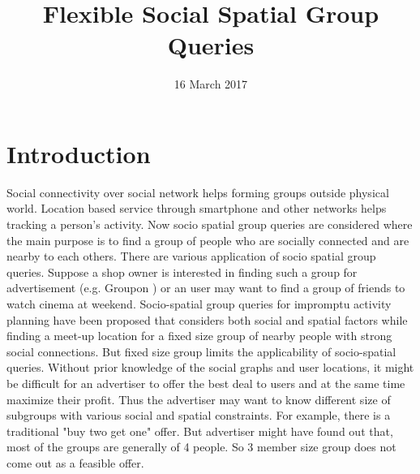 \documentclass{vldb}
\begin{document}
	\title{ Flexible Social Spatial Group Queries}
	
	
	\author{
	}
	
	\date{16 March 2017}
	\maketitle
	
	
	\begin {figure}
	\begin{center}
	
	\end{center}
	\end {figure}
	
	\section{Introduction}
		Social connectivity over social network helps forming groups outside physical world. Location based service through smartphone and other networks helps tracking a person's activity. Now socio spatial group queries are considered where the main purpose is to find a group of  people who are socially connected and are nearby to each others. There are various application of socio spatial group queries. Suppose a shop owner is interested in finding such a group for advertisement (e.g. Groupon )  or an user may want to find a group of friends to watch cinema at weekend.  Socio-spatial group queries for impromptu activity planning have been proposed \cite{shen2016socio}  that considers both social and spatial factors while finding a meet-up location for a fixed size group of nearby people with strong social connections. But fixed size group limits the applicability of socio-spatial queries. Without prior knowledge of the social graphs and user locations, it might be difficult for an advertiser to offer the best deal to users and at the same time maximize their profit. Thus the advertiser may want to know different size of subgroups with various social and spatial constraints. For example, there is a traditional "buy two get one" offer. But advertiser might have found out that, most of the groups are generally of 4 people. So 3 member size group does not come out as a feasible offer. 
		
		
		
\end{document}
